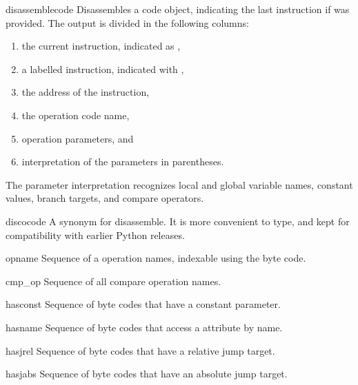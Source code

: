 \begin{funcdesc}{disassemble}{code}
Disassembles a code object, indicating the last instruction if 
was provided.  The output is divided in the following columns:

\begin{enumerate}
\item the current instruction, indicated as \samp{-->},
\item a labelled instruction, indicated with \samp{>>},
\item the address of the instruction,
\item the operation code name,
\item operation parameters, and
\item interpretation of the parameters in parentheses.
\end{enumerate}

The parameter interpretation recognizes local and global
variable names, constant values, branch targets, and compare
operators.
\end{funcdesc}

\begin{funcdesc}{disco}{code}
A synonym for disassemble.  It is more convenient to type, and kept
for compatibility with earlier Python releases.
\end{funcdesc}

\begin{datadesc}{opname}
Sequence of a operation names, indexable using the byte code.
\end{datadesc}

\begin{datadesc}{cmp_op}
Sequence of all compare operation names.
\end{datadesc}

\begin{datadesc}{hasconst}
Sequence of byte codes that have a constant parameter.
\end{datadesc}

\begin{datadesc}{hasname}
Sequence of byte codes that access a attribute by name.
\end{datadesc}

\begin{datadesc}{hasjrel}
Sequence of byte codes that have a relative jump target.
\end{datadesc}

\begin{datadesc}{hasjabs}
Sequence of byte codes that have an absolute jump target.
\end{datadesc}

